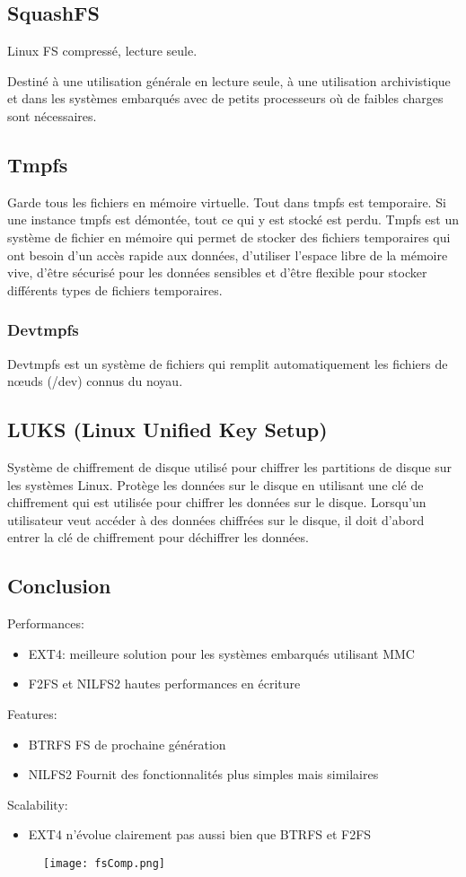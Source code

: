 \subsection{SquashFS}
Linux FS compressé, lecture seule.

Destiné à une utilisation générale en lecture seule, à une utilisation archivistique et dans les systèmes embarqués avec de petits processeurs où de faibles charges sont nécessaires.
\subsection{Tmpfs}
Garde tous les fichiers en mémoire virtuelle. Tout dans tmpfs est temporaire. Si une instance tmpfs est démontée, tout ce qui y est stocké est perdu.
Tmpfs est un système de fichier en mémoire qui permet de stocker des fichiers temporaires qui ont besoin d'un accès rapide aux données, d'utiliser l'espace libre de la mémoire vive, d'être sécurisé pour les données sensibles et d'être flexible pour stocker différents types de fichiers temporaires.
\subsubsection{Devtmpfs}
Devtmpfs est un système de fichiers qui remplit automatiquement les fichiers de nœuds (/dev) connus du noyau.
\subsection{LUKS (Linux Unified Key Setup)}
Système de chiffrement de disque utilisé pour chiffrer les partitions de disque sur les systèmes Linux. Protège les données sur le disque en utilisant une clé de chiffrement qui est utilisée pour chiffrer les données sur le disque. Lorsqu'un utilisateur veut accéder à des données chiffrées sur le disque, il doit d'abord entrer la clé de chiffrement pour déchiffrer les données.
\subsection{Conclusion}
Performances:
\begin{itemize}
    \item EXT4: meilleure solution pour les systèmes embarqués utilisant MMC
    \item F2FS et NILFS2 hautes performances en écriture
\end{itemize}
Features:
\begin{itemize}
    \item BTRFS FS de prochaine génération
    \item NILFS2 Fournit des fonctionnalités plus simples mais similaires
\end{itemize}
Scalability:
\begin{itemize}
    \item EXT4 n'évolue clairement pas aussi bien que BTRFS et F2FS
\end{itemize}
\begin{figure}[H]
    \centering
    \texttt{[image: fsComp.png]}
    \label{fig:fsComp}
\end{figure}
